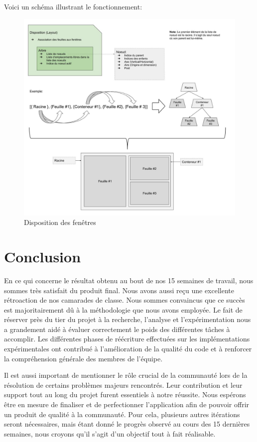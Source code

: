 \documentclass[titlepage]{article}
\begin{document}
Voici un schéma illustrant le fonctionnement:

\begin{figure}[H]
	\centering
	\includegraphics[width=\textwidth]{arbre_de_disposition.jpg}
	\caption{Disposition des fenêtres}
\end{figure}

\section{Conclusion}
\par
En ce qui concerne le résultat obtenu au bout de nos 15 semaines de travail, nous sommes très satisfait du produit final. Nous avons aussi reçu une excellente rétroaction de nos camarades de classe. Nous sommes convaincus que ce succès est majoritairement dû à la méthodologie que nous avons employée. Le fait de réserver près du tier du projet à la recherche, l'analyse et l'expérimentation nous a grandement aidé à évaluer correctement le poids des différentes tâches à accomplir. Les différentes phases de réécriture effectuées sur les implémentations expérimentales ont contribué à l'amélioration de la qualité du code et à renforcer la compréhension générale des membres de l'équipe.
\bigskip

\par
Il est aussi important de mentionner le rôle crucial de la communauté lors de la résolution de certains problèmes majeurs rencontrés. Leur contribution et leur support tout au long du projet furent essentiels à notre réussite. Nous espérons être en mesure de finaliser et de perfectionner l'application afin de pouvoir offrir un produit de qualité à la communauté. Pour cela, plusieurs autres itérations seront nécessaires, mais étant donné le progrès observé au cours des 15 dernières semaines, nous croyons qu'il s'agit d'un objectif tout à fait réalisable.
\bigskip
\end{document}
